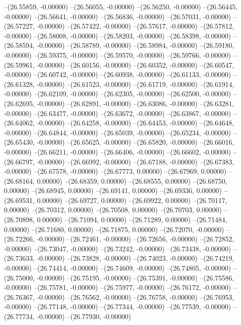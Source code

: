 --(26.55859, -0.00000)
--(26.56055, -0.00000)
--(26.56250, -0.00000)
--(26.56445, -0.00000)
--(26.56641, -0.00000)
--(26.56836, -0.00000)
--(26.57031, -0.00000)
--(26.57227, -0.00000)
--(26.57422, -0.00000)
--(26.57617, -0.00000)
--(26.57812, -0.00000)
--(26.58008, -0.00000)
--(26.58203, -0.00000)
--(26.58398, -0.00000)
--(26.58594, -0.00000)
--(26.58789, -0.00000)
--(26.58984, -0.00000)
--(26.59180, -0.00000)
--(26.59375, -0.00000)
--(26.59570, -0.00000)
--(26.59766, -0.00000)
--(26.59961, -0.00000)
--(26.60156, -0.00000)
--(26.60352, -0.00000)
--(26.60547, -0.00000)
--(26.60742, -0.00000)
--(26.60938, -0.00000)
--(26.61133, -0.00000)
--(26.61328, -0.00000)
--(26.61523, -0.00000)
--(26.61719, -0.00000)
--(26.61914, -0.00000)
--(26.62109, -0.00000)
--(26.62305, -0.00000)
--(26.62500, -0.00000)
--(26.62695, -0.00000)
--(26.62891, -0.00000)
--(26.63086, -0.00000)
--(26.63281, -0.00000)
--(26.63477, -0.00000)
--(26.63672, -0.00000)
--(26.63867, -0.00000)
--(26.64062, -0.00000)
--(26.64258, -0.00000)
--(26.64453, -0.00000)
--(26.64648, -0.00000)
--(26.64844, -0.00000)
--(26.65039, -0.00000)
--(26.65234, -0.00000)
--(26.65430, -0.00000)
--(26.65625, -0.00000)
--(26.65820, -0.00000)
--(26.66016, -0.00000)
--(26.66211, -0.00000)
--(26.66406, -0.00000)
--(26.66602, -0.00000)
--(26.66797, -0.00000)
--(26.66992, -0.00000)
--(26.67188, -0.00000)
--(26.67383, -0.00000)
--(26.67578, -0.00000)
--(26.67773, 0.00000)
--(26.67969, 0.00000)
--(26.68164, 0.00000)
--(26.68359, 0.00000)
--(26.68555, 0.00000)
--(26.68750, 0.00000)
--(26.68945, 0.00000)
--(26.69141, 0.00000)
--(26.69336, 0.00000)
--(26.69531, 0.00000)
--(26.69727, 0.00000)
--(26.69922, 0.00000)
--(26.70117, 0.00000)
--(26.70312, 0.00000)
--(26.70508, 0.00000)
--(26.70703, 0.00000)
--(26.70898, 0.00000)
--(26.71094, 0.00000)
--(26.71289, 0.00000)
--(26.71484, 0.00000)
--(26.71680, 0.00000)
--(26.71875, 0.00000)
--(26.72070, -0.00000)
--(26.72266, -0.00000)
--(26.72461, -0.00000)
--(26.72656, -0.00000)
--(26.72852, -0.00000)
--(26.73047, -0.00000)
--(26.73242, -0.00000)
--(26.73438, -0.00000)
--(26.73633, -0.00000)
--(26.73828, -0.00000)
--(26.74023, -0.00000)
--(26.74219, -0.00000)
--(26.74414, -0.00000)
--(26.74609, -0.00000)
--(26.74805, -0.00000)
--(26.75000, -0.00000)
--(26.75195, -0.00000)
--(26.75391, -0.00000)
--(26.75586, -0.00000)
--(26.75781, -0.00000)
--(26.75977, -0.00000)
--(26.76172, -0.00000)
--(26.76367, -0.00000)
--(26.76562, -0.00000)
--(26.76758, -0.00000)
--(26.76953, -0.00000)
--(26.77148, -0.00000)
--(26.77344, -0.00000)
--(26.77539, -0.00000)
--(26.77734, -0.00000)
--(26.77930, -0.00000)
